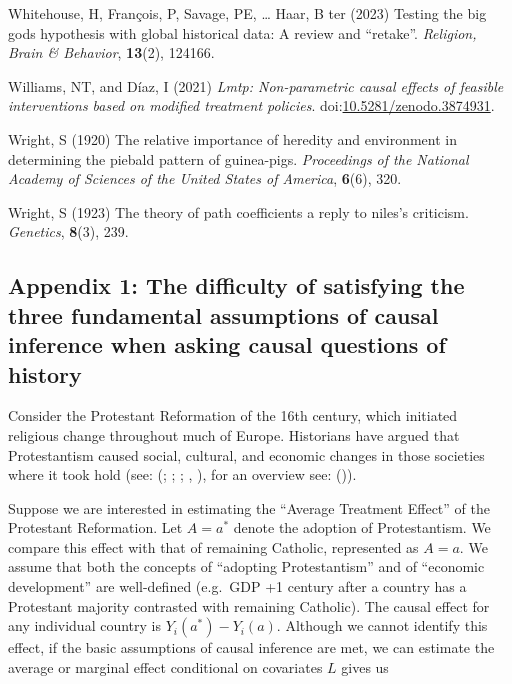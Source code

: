 \documentclass[
  singlecolumn,
  9pt]{article}
\begin{document}
\begin{CSLReferences}
Whitehouse, H, François, P, Savage, PE, \ldots{} Haar, B ter (2023)
Testing the big gods hypothesis with global historical data: A review
and {``}retake{''}. \emph{Religion, Brain \& Behavior}, \textbf{13}(2),
124166.

Williams, NT, and Díaz, I (2021) \emph{Lmtp: Non-parametric causal
effects of feasible interventions based on modified treatment policies}.
doi:\href{https://doi.org/10.5281/zenodo.3874931}{10.5281/zenodo.3874931}.

Wright, S (1920) The relative importance of heredity and environment in
determining the piebald pattern of guinea-pigs. \emph{Proceedings of the
National Academy of Sciences of the United States of America},
\textbf{6}(6), 320.

Wright, S (1923) The theory of path coefficients a reply to niles's
criticism. \emph{Genetics}, \textbf{8}(3), 239.

\end{CSLReferences}

\newpage{}

\subsection{Appendix 1: The difficulty of satisfying the three
fundamental assumptions of causal inference when asking causal questions
of
history}\label{appendix-1-the-difficulty-of-satisfying-the-three-fundamental-assumptions-of-causal-inference-when-asking-causal-questions-of-history}

Consider the Protestant Reformation of the 16th century, which initiated
religious change throughout much of Europe. Historians have argued that
Protestantism caused social, cultural, and economic changes in those
societies where it took hold (see: (; ;
; , ), for an overview see:
()).

Suppose we are interested in estimating the ``Average Treatment Effect''
of the Protestant Reformation. Let \(A = a^*\) denote the adoption of
Protestantism. We compare this effect with that of remaining Catholic,
represented as \(A = a\). We assume that both the concepts of ``adopting
Protestantism'' and of ``economic development'' are well-defined
(e.g.~GDP +1 century after a country has a Protestant majority
contrasted with remaining Catholic). The causal effect for any
individual country is \(Y_i(a^*) - Y_i(a)\). Although we cannot identify
this effect, if the basic assumptions of causal inference are met, we
can estimate the average or marginal effect conditional on covariates
\(L\) gives us
\end{document}
